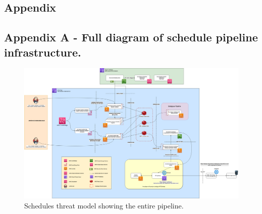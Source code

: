 
\begin{landscape}
  \section{Appendix}
    \subsection{Appendix A - Full diagram of schedule pipeline infrastructure.}
      \begin{figure}[H]
        \centering
        \includegraphics[width=18cm]{assets/schedulesThreatModel.drawio.png}
        \caption{Schedules threat model showing the entire pipeline.}
      \end{figure}  
\end{landscape}

